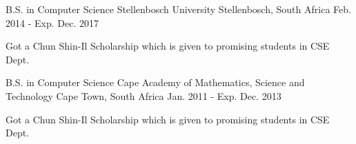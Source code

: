 

\begin{cventries}

  \cventry
    {B.S. in Computer Science } %
    {Stellenbosch University} %
    {Stellenbosch, South Africa} %
    {Feb. 2014 - Exp. Dec. 2017} %
    {
      \begin{cvitems} %
        \item {Got a Chun Shin-Il Scholarship which is given to promising students in CSE Dept.}
      \end{cvitems}
    }

\end{cventries}
\begin{cventries}

  \cventry
    {B.S. in Computer Science } %
    {Cape Academy of Mathematics, Science and Technology} %
    {Cape Town, South Africa} %
    {Jan. 2011 - Exp. Dec. 2013} %
    {
      \begin{cvitems} %
        \item {Got a Chun Shin-Il Scholarship which is given to promising students in CSE Dept.}
      \end{cvitems}
    }

\end{cventries}
